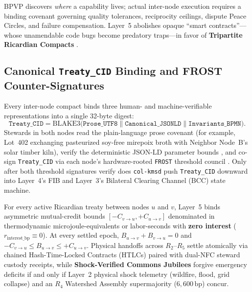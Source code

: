 BPVP discovers \textit{where} a capability lives; actual inter-node execution requires a binding
covenant governing quality tolerances, reciprocity ceilings, dispute Peace Circles, and failure
compensation. Layer~5 abolishes opaque ``smart contracts''---whose unamendable code bugs become
predatory traps---in favor of \textbf{Tripartite Ricardian Compacts} \parencite{grigg2004}.

\subsection{Canonical \texttt{Treaty\_CID} Binding and FROST Counter-Signatures}

Every inter-node compact binds three human- and machine-verifiable representations into a single
32-byte digest:
\begin{equation}
    \mathtt{Treaty\_CID} = \mathrm{BLAKE3}\bigl(\mathtt{Prose\_UTF8} \parallel
    \mathtt{Canonical\_JSONLD} \parallel \mathtt{Invariants\_BPMN}\bigr).
\end{equation}
Stewards in both nodes read the plain-language prose covenant (for example, Lot~402 exchanging
pasteurized soy-free mirepoix broth with Neighbor Node~B's solar timber kiln), verify the deterministic
JSON-LD parameter bounds \parencite{w3c2020jsonld}, and co-sign \texttt{Treaty\_CID} via each node's
hardware-rooted \texttt{FROST} threshold council \parencite{komlo2020frost}. Only after both
threshold signatures verify does \texttt{col-kmsd} push \texttt{Treaty\_CID} downward into Layer~4's
FIB and Layer~3's Bilateral Clearing Channel (BCC) state machine.

\begin{invariant}
\label{inv:ch5-bcc-zerosum}
For every active Ricardian treaty between nodes $u$ and $v$, Layer~5 binds asymmetric mutual-credit
bounds $[-C_{v\to u}, +C_{u\to v}]$ denominated in thermodynamic microjoule-equivalents or labor-seconds
with \textbf{zero interest} ($r_{\mathrm{interest\_bp}} \equiv 0$). At every settled epoch,
$B_{u\to v} + B_{v\to u} = 0$ and $-C_{v\to u} \le B_{u\to v} \le +C_{u\to v}$. Physical handoffs across
$R_2\text{--}R_5$ settle atomically via chained Hash-Time-Locked Contracts (HTLCs) paired with
dual-NFC steward custody receipts, while \textbf{Shock-Verified Commons Jubilees} forgive emergency
deficits if and only if Layer~2 physical shock telemetry (wildfire, flood, grid collapse) and an
$R_4$ Watershed Assembly supermajority ($6{,}600\,\mathrm{bp}$) concur.
\end{invariant}

